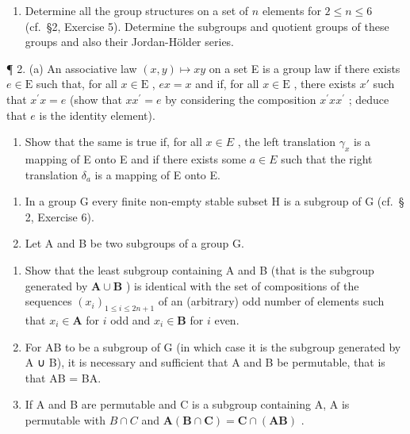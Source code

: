\BourbakiExercisesSection

\begin{enumerate}
\def\labelenumi{\arabic{enumi}.}
\tightlist
\item
  Determine all the group structures on a set of \(n\) elements for \(2 \leqslant n \leqslant 6\) (cf.~§2, Exercise 5). Determine the subgroups and quotient groups of these groups and also their Jordan-Hölder series.
\end{enumerate}

¶ 2. (a) An associative law \((x,y)\mapsto xy\) on a set E is a group law if there exists \(e\in\mathrm{E}\) such that, for all \(x\in\mathrm{E}\) , \(ex=x\) and if, for all \(x\in\mathrm{E}\) , there exists \(x'\) such that \(x^{\prime}x=e\) (show that \(xx^{\prime}=e\) by considering the composition \(x^{\prime}xx^{\prime}\) ; deduce that \(e\) is the identity element).

\begin{enumerate}
\def\labelenumi{(\alph{enumi})}
\setcounter{enumi}{1}
\tightlist
\item
  Show that the same is true if, for all \(x \in E\) , the left translation \(\gamma_{x}\) is a mapping of E onto E and if there exists some \(a \in E\) such that the right translation \(\delta_{a}\) is a mapping of E onto E.
\end{enumerate}

\begin{enumerate}
\def\labelenumi{\arabic{enumi}.}
\setcounter{enumi}{2}
\item
  In a group G every finite non-empty stable subset H is a subgroup of G (cf.~§ 2, Exercise 6).
\item
  Let A and B be two subgroups of a group G.
\end{enumerate}

\begin{enumerate}
\def\labelenumi{(\alph{enumi})}
\item
  Show that the least subgroup containing A and B (that is the subgroup generated by \(\mathbf{A} \cup \mathbf{B}\) ) is identical with the set of compositions of the sequences \((x_{i})_{1 \leqslant i \leqslant 2n + 1}\) of an (arbitrary) odd number of elements such that \(x_{i} \in \mathbf{A}\) for \(i\) odd and \(x_{i} \in \mathbf{B}\) for \(i\) even.
\item
  For AB to be a subgroup of G (in which case it is the subgroup generated by A ∪ B), it is necessary and sufficient that A and B be permutable, that is that AB = BA.
\item
  If A and B are permutable and C is a subgroup containing A, A is permutable with \(B \cap C\) and \(\mathbf{A}(\mathbf{B} \cap \mathbf{C}) = \mathbf{C} \cap (\mathbf{AB})\) .
\end{enumerate}

